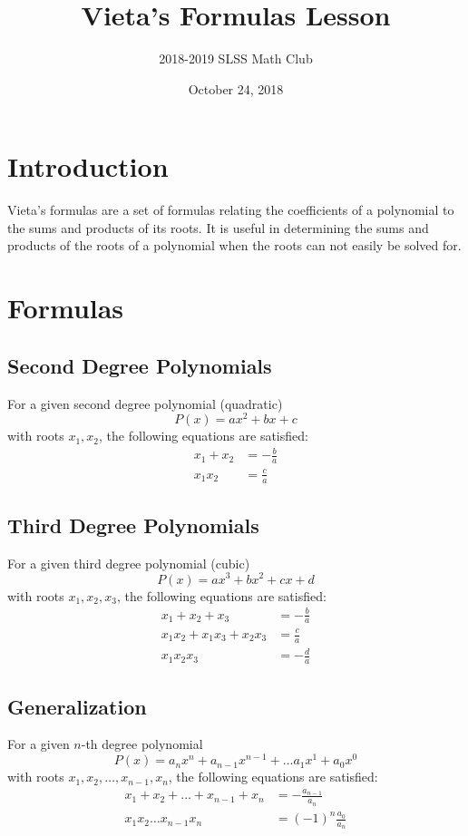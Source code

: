 \documentclass[12pt]{article}
\title{Vieta's Formulas Lesson\vspace{-3mm}}
\author{2018-2019 SLSS Math Club\vspace{-5mm}}
\date{October 24, 2018\vspace{-5mm}}
\begin{document}
\maketitle
\section{Introduction}
Vieta's formulas are a set of formulas relating the coefficients of a polynomial to the sums and products of its roots. It is useful in determining the sums and products of the roots of a polynomial when the roots can not easily be solved for.

\section{Formulas}
\subsection{Second Degree Polynomials}
For a given second degree polynomial (quadratic) $$P(x)=ax^2 + bx + c$$ with roots $x_1, x_2$, the following equations are satisfied:
\begin{align*}
    x_1 + x_2 & = -\frac{b}{a} \\
    x_1x_2 & = \frac{c}{a}
\end{align*}

\subsection{Third Degree Polynomials}
For a given third degree polynomial (cubic) $$P(x) = ax^3 + bx^2 + cx + d$$ with roots $x_1, x_2, x_3$, the following equations are satisfied:
\begin{align*}
    x_1 + x_2 + x_3 & = -\frac{b}{a} \\
    x_1x_2 + x_1x_3 + x_2x_3 & = \frac{c}{a} \\
    x_1x_2x_3 & = -\frac{d}{a}
\end{align*}

\subsection{Generalization}
For a given $n$-th degree polynomial $$P(x)=a_nx^n + a_{n-1}x^{n-1} + \dots a_1x^1 + a_0x^0$$ with roots $x_1, x_2, \dots, x_{n-1}, x_n$, the following equations are satisfied:
\begin{align*}
    x_1 + x_2 + \dots + x_{n-1} + x_n & = -\frac{a_{n-1}}{a_n} \\
    x_1x_2\dots x_{n-1}x_n & = (-1)^n\frac{a_0}{a_n}
\end{align*}
\end{document}
